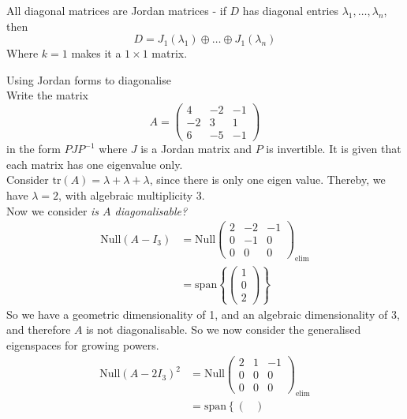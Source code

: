 \documentclass[journal, letterpaper]{IEEEtran}
\begin{document}
    All diagonal matrices are Jordan matrices - if $D$ has diagonal entries $\lambda_1, \dots, \lambda_n$, then
    $$ D = J_1(\lambda_1) \oplus \dots \oplus J_1(\lambda_n)$$
    Where $k=1$ makes it a $1 \times 1$ matrix.
    \begin{myboxg}{Using Jordan forms to diagonalise} \\ 
        Write the matrix
        $$ A = \begin{pmatrix}
            4 & -2 & -1 \\ -2 & 3 & 1 \\ 
            6 & -5 & -1
        \end{pmatrix}$$
        in the form $PJP^{-1}$ where $J$ is a Jordan matrix and $P$ is invertible. It is given that each matrix has one eigenvalue only.
        \newline \\ 
        Consider $\text{tr}(A) = \lambda + \lambda + \lambda$, since there is only one eigen value. Thereby, we have
        $\lambda = 2$, with algebraic multiplicity 3. 
        \newline \\
        Now we consider \textit{is $A$ diagonalisable?}
        \begin{align*}
        \text{Null}(A - I_3) &= \text{Null}\begin{pmatrix}
            2 & -2 & -1 \\ 0 & -1 & 0 \\ 0 & 0 & 0
        \end{pmatrix}_{\text{elim}} \\
        &= \text{span}\left\{\begin{pmatrix}
        1 \\ 0 \\ 2
        \end{pmatrix} \right\}
        \end{align*}
        So we have a geometric dimensionality of 1, and an algebraic dimensionality of 3, and therefore $A$ is 
        not diagonalisable. So we now consider the generalised eigenspaces for growing powers.
        \begin{align*}
            \text{Null}(A - 2I_3)^2 &= \text{Null}\begin{pmatrix}
                2 & 1 & -1 \\ 0 & 0 & 0 \\ 0 & 0 & 0
            \end{pmatrix}_\text{elim} \\ &= \text{span}\left\{ \begin{pmatrix}

\end{pmatrix}
\end{align*}
\end{myboxg}
\end{document}
